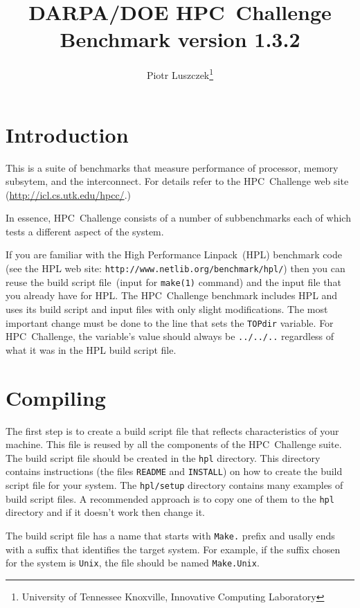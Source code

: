 \documentclass[twocolumn]{article}
\begin{document}
\title{DARPA/DOE HPC~Challenge Benchmark version 1.3.2}
\author{Piotr Luszczek\footnote{University of Tennessee Knoxville, Innovative
Computing Laboratory}}
\maketitle

\section{Introduction}
This is a suite of benchmarks that measure performance of processor,
memory subsytem, and the interconnect. For details refer to the
HPC~Challenge web site (\url{http://icl.cs.utk.edu/hpcc/}.)

In essence, HPC~Challenge consists of a number of subbenchmarks each
of which tests a different aspect of the system.

If you are familiar with the High Performance Linpack~(HPL) benchmark
code (see the HPL web site:
\texttt{http://www.netlib.org/benchmark/hpl/}) then you can reuse the
build script file~(input for \texttt{make(1)} command) and the input
file that you already have for HPL. The HPC~Challenge benchmark
includes HPL and uses its build script and input files with only
slight modifications. The most important change must be done to the
line that sets the \texttt{TOPdir} variable. For HPC~Challenge, the
variable's value should always be \texttt{../../..} regardless of what
it was in the HPL build script file.

\section{Compiling}
The first step is to create a build script file that reflects
characteristics of your machine. This file is reused by all the
components of the HPC~Challenge suite. The build script file should be
created in the \texttt{hpl} directory. This directory contains
instructions (the files \texttt{README} and \texttt{INSTALL}) on how
to create the build script file for your system. The
\texttt{hpl/setup} directory contains many examples of build script
files. A recommended approach is to copy one of them to the
\texttt{hpl} directory and if it doesn't work then change it.

The build script file has a name that starts with \texttt{Make.}
prefix and usally ends with a suffix that identifies the target
system. For example, if the suffix chosen for the system is
\texttt{Unix}, the file should be named \texttt{Make.Unix}.
\end{document}
